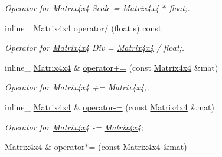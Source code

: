 \begin{DoxyCompactItemize}
\begin{DoxyCompactList}\small\item\em Operator for \hyperlink{classMatrix4x4}{Matrix4x4} Scale = \hyperlink{classMatrix4x4}{Matrix4x4} $\ast$ float;. \end{DoxyCompactList}\item 
inline\+\_\+ \hyperlink{classMatrix4x4}{Matrix4x4} \hyperlink{classMatrix4x4_a7409459b4e7c25164031148b290ba899}{operator/} (float s) const \hypertarget{classMatrix4x4_a7409459b4e7c25164031148b290ba899}{}\label{classMatrix4x4_a7409459b4e7c25164031148b290ba899}

\begin{DoxyCompactList}\small\item\em Operator for \hyperlink{classMatrix4x4}{Matrix4x4} Div = \hyperlink{classMatrix4x4}{Matrix4x4} / float;. \end{DoxyCompactList}\item 
inline\+\_\+ \hyperlink{classMatrix4x4}{Matrix4x4} \& \hyperlink{classMatrix4x4_a8646f6d6d1ecfd9d56f2d943056ad80d}{operator+=} (const \hyperlink{classMatrix4x4}{Matrix4x4} \&mat)\hypertarget{classMatrix4x4_a8646f6d6d1ecfd9d56f2d943056ad80d}{}\label{classMatrix4x4_a8646f6d6d1ecfd9d56f2d943056ad80d}

\begin{DoxyCompactList}\small\item\em Operator for \hyperlink{classMatrix4x4}{Matrix4x4} += \hyperlink{classMatrix4x4}{Matrix4x4};. \end{DoxyCompactList}\item 
inline\+\_\+ \hyperlink{classMatrix4x4}{Matrix4x4} \& \hyperlink{classMatrix4x4_a95b6e7baaaa01c70666b11ba30f22dd9}{operator-\/=} (const \hyperlink{classMatrix4x4}{Matrix4x4} \&mat)\hypertarget{classMatrix4x4_a95b6e7baaaa01c70666b11ba30f22dd9}{}\label{classMatrix4x4_a95b6e7baaaa01c70666b11ba30f22dd9}

\begin{DoxyCompactList}\small\item\em Operator for \hyperlink{classMatrix4x4}{Matrix4x4} -\/= \hyperlink{classMatrix4x4}{Matrix4x4};. \end{DoxyCompactList}\item 
\hyperlink{classMatrix4x4}{Matrix4x4} \& \hyperlink{classMatrix4x4_a94fe48c8fe7bc602a382e25c9f80c5cf}{operator$\ast$=} (const \hyperlink{classMatrix4x4}{Matrix4x4} \&mat)\hypertarget{classMatrix4x4_a94fe48c8fe7bc602a382e25c9f80c5cf}{}\label{classMatrix4x4_a94fe48c8fe7bc602a382e25c9f80c5cf}


\end{DoxyCompactItemize}
